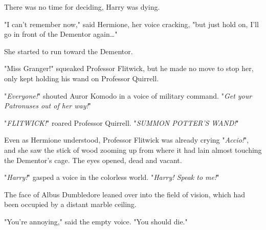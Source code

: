 There was no time for deciding, Harry was dying.

"I can't remember now," said Hermione, her voice cracking, "but just hold on, 
I'll go in front of the Dementor again{\ldots}"

She started to run toward the Dementor.

"Miss Granger!" squeaked Professor Flitwick, but he made no move to stop her, 
only kept holding his wand on Professor Quirrell.

"\emph{Everyone!}" shouted Auror Komodo in a voice of military command. 
"\emph{Get your Patronuses out of her way!}"

"\emph{FLITWICK!}" roared Professor Quirrell. "\emph{SUMMON POTTER'S WAND!}"

Even as Hermione understood, Professor Flitwick was already crying 
"\emph{Accio!}", and she saw the stick of wood zooming up from where it had 
lain almost touching the Dementor's cage.
\sbreak
The eyes opened, dead and vacant.

"\emph{Harry!}" gasped a voice in the colorless world. "\emph{Harry! Speak to 
me!}"

The face of Albus Dumbledore leaned over into the field of vision, which had 
been occupied by a distant marble ceiling.

"You're annoying," said the empty voice. "You should die."
